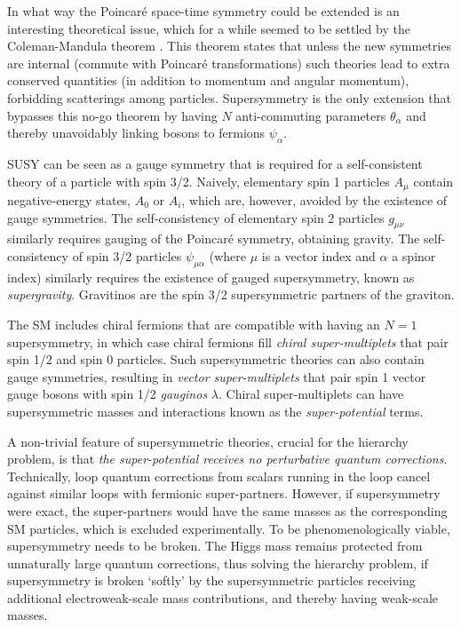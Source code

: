 \medskip

In what way the Poincar\'e space-time symmetry could be extended is an interesting theoretical issue,
which for a while seemed to be settled by the Coleman-Mandula theorem \cite{Coleman:Mandula}.
This theorem states that unless the new symmetries are internal (commute with Poincar\'e transformations) such theories lead to extra conserved quantities (in addition to momentum and angular momentum), forbidding scatterings among particles.
Supersymmetry is the only extension that bypasses this no-go theorem by having $N$ anti-commuting parameters $\theta_\alpha$
and thereby unavoidably linking bosons to fermions $\psi_\alpha$.

\smallskip

SUSY can be seen as a gauge symmetry that is required for a self-consistent theory of a particle with spin 3/2.
Naively,  elementary spin 1 particles $A_\mu$ contain negative-energy states, $A_0$ or $A_i$, which are, however, 
avoided by the existence of gauge symmetries.  
The self-consistency of elementary spin 2 particles $g_{\mu\nu}$ similarly requires gauging of the Poincar\'e symmetry, obtaining gravity.
The self-consistency of spin 3/2 particles $\psi_{\mu\alpha}$ (where $\mu$ is a vector index and $\alpha$ a spinor index)
similarly requires the existence of gauged supersymmetry, known as {\em supergravity}.
Gravitinos are the spin 3/2 supersymmetric partners of the graviton.


\smallskip

The SM includes chiral fermions that are compatible with having an $N=1$ supersymmetry, in which case
chiral fermions fill {\em chiral super-multiplets} that pair spin 1/2 and spin 0 particles. 
Such supersymmetric theories can also contain gauge symmetries, resulting in {\em vector super-multiplets} that pair spin 1 vector gauge bosons with spin 1/2 {\em gauginos} $\lambda$.
Chiral super-multiplets can have supersymmetric masses and interactions known as the {\em super-potential} terms.

\smallskip

A non-trivial feature of supersymmetric theories, crucial for the hierarchy problem,
 is that {\em the super-potential receives no perturbative quantum corrections}.
Technically, loop quantum corrections from scalars running in the loop cancel against similar loops with fermionic super-partners. 
However, if supersymmetry were exact, the super-partners would have the same masses as the corresponding SM particles, which is excluded experimentally. 
To be phenomenologically viable, supersymmetry needs to be broken. 
The Higgs mass remains protected from unnaturally large quantum corrections, thus solving the hierarchy problem,
if supersymmetry is broken `softly' by the supersymmetric particles receiving additional electroweak-scale mass contributions,
and thereby having weak-scale masses.

